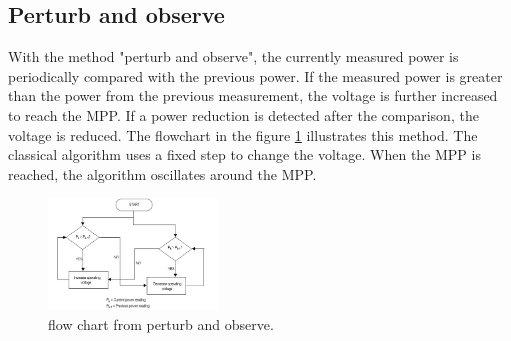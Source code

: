 \subsection{Perturb and observe}
With the method "perturb and observe", the currently measured power is periodically compared with the previous power. If the measured power is greater than the power from the previous measurement, the voltage is further increased to reach the MPP. If a power reduction is detected after the comparison, the voltage is reduced. The flowchart in the figure \ref{fcperturbandobserve} illustrates this method. The classical algorithm uses a fixed step to change the voltage. When the MPP is reached, the algorithm oscillates around the MPP\cite{}.

\begin{figure}[htbp]
	\begin{center}
		\includegraphics[width=0.4\textwidth]{../Pictures/P1/Flow_chart/flow_chart_perturb_observe}
		\caption{flow chart from perturb and observe\cite{}.}
		\label{fcperturbandobserve}
	\end{center}	
\end{figure}

